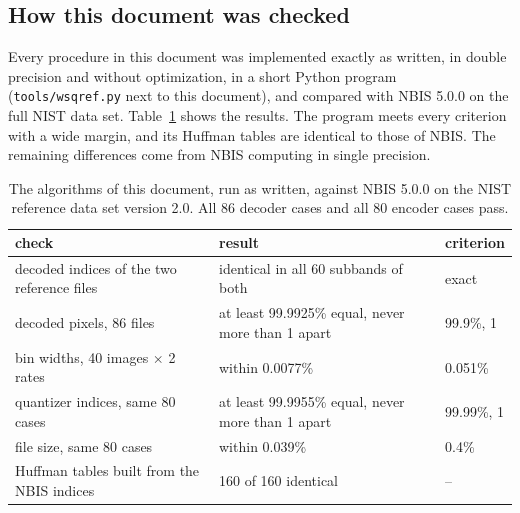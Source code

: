 \subsection{How this document was checked}

Every procedure in this document was implemented exactly as written, in double precision and
without optimization, in a short Python program (\texttt{tools/wsqref.py} next to this
document), and compared with NBIS 5.0.0 on the full NIST data set. Table~\ref{tab:checks} shows
the results. The program meets every criterion with a wide margin, and its Huffman tables are
identical to those of NBIS. The remaining differences come from NBIS computing in single
precision.

\begin{table}[ht]
  \centering\small
  \begin{tabular}{@{}lll@{}}
    \toprule
    check & result & criterion \\
    \midrule
    decoded indices of the two reference files & identical in all 60 subbands of both & exact \\
    decoded pixels, 86 files & at least 99.9925\% equal, never more than 1 apart & 99.9\%, 1 \\
    bin widths, 40 images $\times$ 2 rates & within 0.0077\% & 0.051\% \\
    quantizer indices, same 80 cases & at least 99.9955\% equal, never more than 1 apart & 99.99\%, 1 \\
    file size, same 80 cases & within 0.039\% & 0.4\% \\
    Huffman tables built from the NBIS indices & 160 of 160 identical & -- \\
    \bottomrule
  \end{tabular}
  \caption{The algorithms of this document, run as written, against NBIS 5.0.0 on the NIST
  reference data set version 2.0. All 86 decoder cases and all 80 encoder cases pass.}
  \label{tab:checks}
\end{table}
